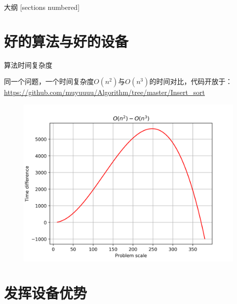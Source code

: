 \documentclass[algorithm,pgfplots]{cuzbeamer}
\begin{document}
    
    \maketitle

    \begin{frame}{大纲}
        [sections numbered]
        \tableofcontents
    \end{frame}

    \section{好的算法与好的设备}

    \begin{frame}{算法时间复杂度}
        \begin{leftbar}
            同一个问题，一个时间复杂度$O(n^2)$与$O(n^3)$的时间对比，代码开放于：
            {\sffamily \url{https://github.com/muyuuuu/Algorithm/tree/master/Insert_sort}}
        \end{leftbar}
        \begin{figure}[h]
            \includegraphics[scale=0.55]{figure/time-complexity.png}
        \end{figure}
    \end{frame}

    \section{发挥设备优势}
\end{document}
